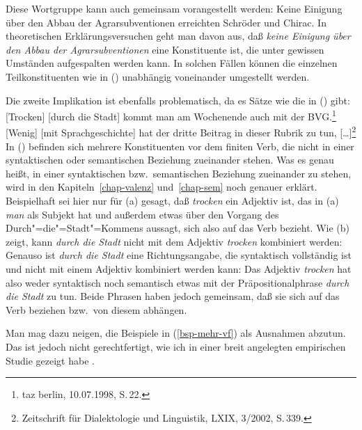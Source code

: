 Diese Wortgruppe kann auch gemeinsam vorangestellt werden:
\ea
Keine Einigung über den Abbau der Agrarsubventionen erreichten Schröder und Chirac.
\z
In theoretischen Erklärungsversuchen geht man davon aus, daß \emph{keine Einigung über den Abbau der Agrarsubventionen}
eine Konstituente ist, die unter gewissen Umständen aufgespalten werden kann. In solchen Fällen können die einzelnen
Teilkonstituenten wie in () unabhängig voneinander umgestellt werden.



Die zweite Implikation ist ebenfalls problematisch, da es Sätze
wie die in () gibt:
\eal
\label{bsp-mehr-vf}
\ex\label{bsp-trocken-durch-die-stadt}
{}[Trocken] [durch die Stadt] kommt man am Wochenende auch mit der BVG.\footnote{
        taz berlin, 10.07.1998, S.\,22.
      }
\ex {}[Wenig] [mit Sprachgeschichte] hat der dritte Beitrag in dieser Rubrik zu tun, [\ldots]\footnote{
  Zeitschrift für Dialektologie und Linguistik, LXIX, 3/2002, S.\,339.
}
\zl
In () befinden sich mehrere Konstituenten vor dem finiten Verb, die nicht in einer syntaktischen
oder semantischen
Beziehung zueinander stehen. Was es genau heißt,
in einer syntaktischen bzw.\ semantischen Beziehung zueinander zu stehen, wird in den
Kapiteln~\ref{chap-valenz} und~\ref{chap-sem} noch genauer erklärt. Beispielhaft sei hier nur
für (a) gesagt, daß \emph{trocken} ein Adjektiv ist, das in (a) \emph{man}
als Subjekt hat und außerdem etwas über den Vorgang des Durch"=die"=Stadt"=Kommens aussagt,
sich also auf das Verb bezieht. Wie (b) zeigt, kann \emph{durch die Stadt} nicht
mit dem Adjektiv \emph{trocken} kombiniert werden:
\eal
{}
\zl
Genauso ist \emph{durch die Stadt} eine Richtungsangabe, die syntaktisch vollständig ist
und nicht mit einem Adjektiv kombiniert werden kann:
\eal
{}
\zl
Das Adjektiv \emph{trocken} hat also weder syntaktisch noch semantisch etwas mit 
der Präpositionalphrase \emph{durch die Stadt} zu tun. Beide Phrasen haben jedoch gemeinsam,
daß sie sich auf das Verb beziehen bzw.\ von diesem abhängen.

Man mag dazu neigen, die Beispiele in (\ref{bsp-mehr-vf}) als Ausnahmen
abzutun. Das ist jedoch nicht gerechtfertigt, wie ich in einer breit angelegten empirischen
Studie gezeigt habe \citep{Mueller2003b}.

